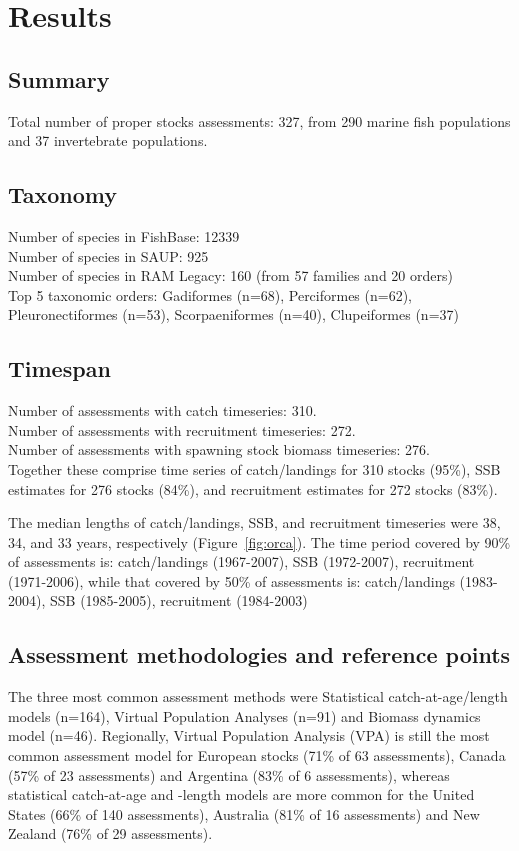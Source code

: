 \section*{Results}
\subsection*{Summary}
\noindent
Total number of proper stocks assessments: 327, from 290 marine fish populations and 37
invertebrate populations.

\subsection*{Taxonomy}
\noindent

Number of species in FishBase: 12339\\
Number of species in SAUP: 925\\
Number of species in RAM Legacy: 160 (from 57 families and 20 orders) \\
Top 5 taxonomic orders: Gadiformes (n=68), Perciformes (n=62), Pleuronectiformes (n=53), Scorpaeniformes (n=40), Clupeiformes (n=37) \\

\subsection*{Timespan}
\noindent
Number of assessments with catch timeseries: 310.\\
Number of assessments with recruitment timeseries: 272.\\
Number of assessments with spawning stock biomass timeseries: 276.\\

Together these comprise time series of
catch/landings for 310 stocks (95\%),
SSB estimates for 276 stocks (84\%), and recruitment estimates for
272 stocks (83\%).

The median lengths of catch/landings, SSB, and recruitment timeseries
were 38, 34, and 33
years, respectively (Figure~\ref{fig:orca}).  The time period covered by 90\% of assessments
is: catch/landings (1967-2007), SSB
(1972-2007), recruitment (1971-2006), while that
covered by 50\% of assessments is: catch/landings
(1983-2004), SSB (1985-2005), recruitment
(1984-2003)
 
\subsection*{Assessment methodologies and reference points}
\noindent
The three most common assessment methods were
Statistical catch-at-age/length models (n=164), Virtual Population Analyses (n=91) and
Biomass dynamics model (n=46). Regionally, Virtual Population Analysis
(VPA) is still the most common assessment model for European stocks
(71\% of 63 assessments),
Canada (57\% of 23
assessments) and Argentina (83\% of
6 assessments), whereas statistical catch-at-age
and -length models are more common for the United States
(66\% of 140 assessments),
Australia (81\% of 16
assessments) and New Zealand (76\% of
29 assessments).

